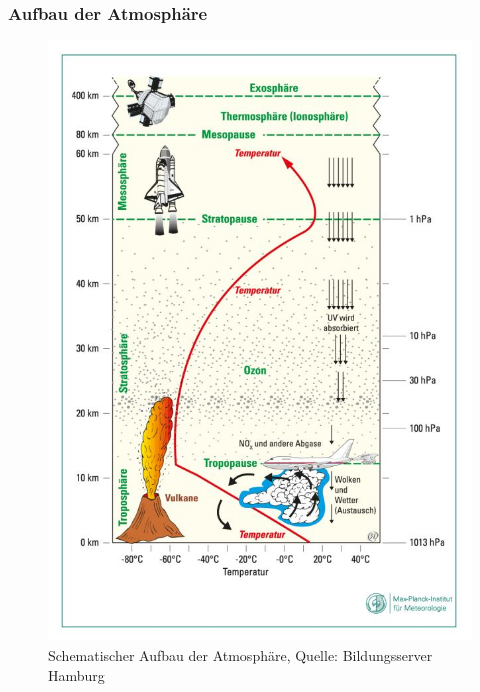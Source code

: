 \begin{frame}
	\frametitle{Aufbau der Atmosphäre}
	\begin{figure}
		\centering
		\includegraphics{bilder/atmosphaere-stockwerkaufbau_bildungsserver_hh.jpg}
		\caption{Schematischer Aufbau der Atmosphäre, Quelle: Bildungsserver Hamburg}
	\end{figure}


\end{frame}
